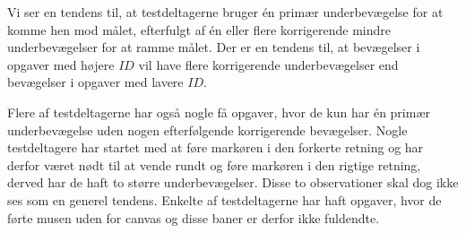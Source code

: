 Vi ser en tendens til, at testdeltagerne bruger én primær underbevægelse for at komme hen mod målet, efterfulgt af én eller flere korrigerende mindre underbevægelser for at ramme målet. Der er en tendens til, at bevægelser i opgaver med højere $ID$ vil have flere korrigerende underbevægelser end bevægelser i opgaver med lavere $ID$. 

Flere af testdeltagerne har også nogle få opgaver, hvor de kun har én primær underbevægelse uden nogen efterfølgende korrigerende bevægelser. Nogle testdeltagere har startet med at føre markøren i den forkerte retning og har derfor været nødt til at vende rundt og føre markøren i den rigtige retning, derved har de haft to større underbevægelser. Disse to observationer skal dog ikke ses som en generel tendens. Enkelte af testdeltagerne har haft opgaver, hvor de førte musen uden for canvas og disse baner er derfor ikke fuldendte.


